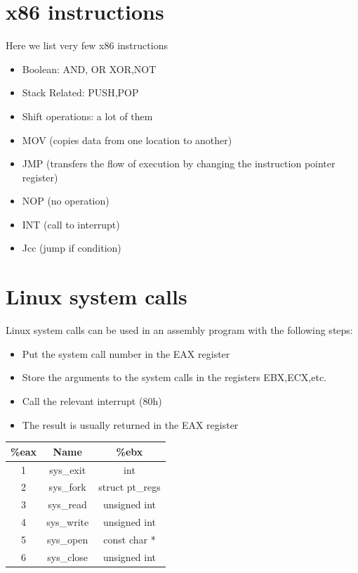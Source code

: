 \documentclass[10pt,a4paper]{book}
\begin{document}
\section{x86 instructions}
Here we list very few  x86 instructions
\begin{itemize}
\item Boolean: AND, OR XOR,NOT
\item Stack Related: PUSH,POP
\item Shift operations: a lot of them
\item MOV (copies data from one location to another)
\item JMP (transfers the flow of execution by changing the instruction pointer register)
\item NOP (no operation)
\item INT (call to interrupt)
\item Jcc (jump if condition)
\end{itemize}
\section{Linux system calls}
Linux system calls can be used in an assembly program with the following steps:
\begin{itemize}
\item Put the system call number in the EAX register
\item Store the arguments to the system calls in the registers EBX,ECX,etc.
\item Call the relevant interrupt (80h)
\item The result is usually returned in the EAX register 
\end{itemize}
\begin{tabular}{|c|c|c|}
\hline 
\%eax & Name & \%ebx \\ 
\hline 
1 & sys\_exit & int \\ 
\hline 
2 & sys\_fork & struct pt\_regs \\ 
\hline 
3 & sys\_read & unsigned int \\ 
\hline 
4 & sys\_write & unsigned int \\ 
\hline 
5 & sys\_open & const char * \\ 
\hline 
6 & sys\_close & unsigned int \\ 
\hline 
\end{tabular} 
\newpage
\end{document}
